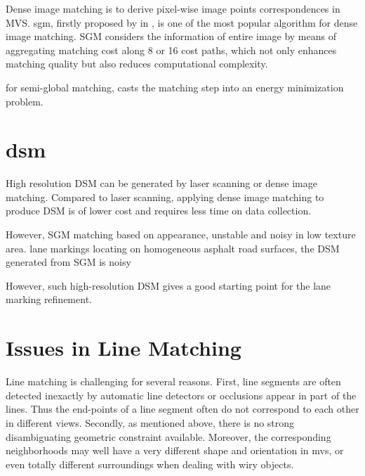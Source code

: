 Dense image matching is to derive pixel-wise image points correspondences in MVS. \gls{sgm}, firstly proposed by \citeauthor{Hirschmueller2008} in \citeyear{Hirschmueller2008}, is one of the most popular algorithm for dense image matching. SGM considers the information of entire image by means of aggregating matching cost along 8 or 16 cost paths, which not only enhances matching quality but also reduces computational complexity.


for semi-global matching, casts the matching step into an energy minimization problem.




\section{\gls{dsm}}

High resolution DSM can be generated by laser scanning or dense image matching. Compared to laser scanning, applying dense image matching to produce DSM is of lower cost and requires less time on data collection. 

However, 
SGM matching based on appearance,
unstable and noisy in low texture area.  
lane markings locating on homogeneous asphalt road surfaces, the DSM generated from SGM is noisy


However, such high-resolution DSM gives a good starting point for the lane marking refinement.


\section{Issues in Line Matching}

Line matching is challenging for several reasons. First, line segments are often detected inexactly by automatic line detectors or occlusions appear in part of the lines. Thus the end-points of a line segment often do not correspond to each other in different views. Secondly, as mentioned above, there is no strong disambiguating geometric constraint available. Moreover, the corresponding neighborhoods may well have a very different shape and orientation in \gls{mvs}, or even totally different surroundings when dealing with wiry objects.\cite{SchmidJun1997,HoferFeb2013}




